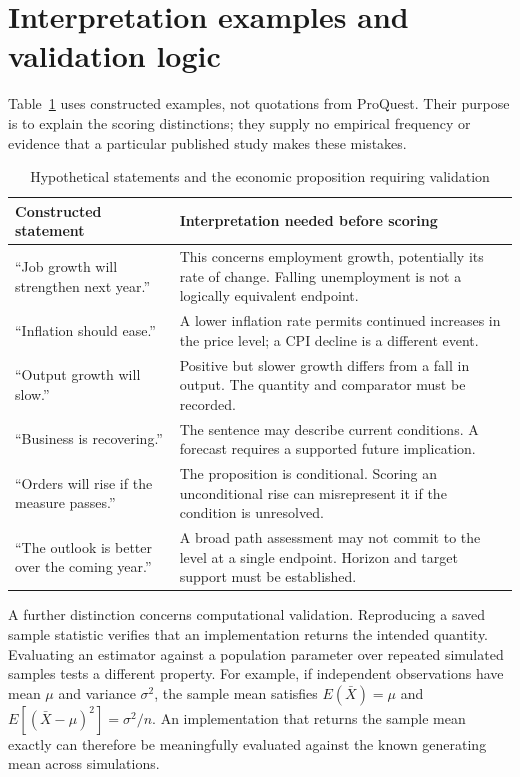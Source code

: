 \section{Interpretation examples and validation logic}\label{app:examples}
Table~\ref{tab:examples} uses constructed examples, not quotations from ProQuest. Their purpose is to explain the scoring distinctions; they supply no empirical frequency or evidence that a particular published study makes these mistakes.

\begin{table}[h]
\caption{Hypothetical statements and the economic proposition requiring validation}\label{tab:examples}
\small
\begin{tabularx}{\linewidth}{p{.30\linewidth}X}
\toprule
Constructed statement & Interpretation needed before scoring\\
\midrule
``Job growth will strengthen next year.'' & This concerns employment growth, potentially its rate of change. Falling unemployment is not a logically equivalent endpoint.\\[5pt]
``Inflation should ease.'' & A lower inflation rate permits continued increases in the price level; a CPI decline is a different event.\\[5pt]
``Output growth will slow.'' & Positive but slower growth differs from a fall in output. The quantity and comparator must be recorded.\\[5pt]
``Business is recovering.'' & The sentence may describe current conditions. A forecast requires a supported future implication.\\[5pt]
``Orders will rise if the measure passes.'' & The proposition is conditional. Scoring an unconditional rise can misrepresent it if the condition is unresolved.\\[5pt]
``The outlook is better over the coming year.'' & A broad path assessment may not commit to the level at a single endpoint. Horizon and target support must be established.\\
\bottomrule
\end{tabularx}
\end{table}

A further distinction concerns computational validation. Reproducing a saved sample statistic verifies that an implementation returns the intended quantity. Evaluating an estimator against a population parameter over repeated simulated samples tests a different property. For example, if independent observations have mean $\mu$ and variance $\sigma^2$, the sample mean satisfies $E(\bar X)=\mu$ and $E[(\bar X-\mu)^2]=\sigma^2/n$. An implementation that returns the sample mean exactly can therefore be meaningfully evaluated against the known generating mean across simulations.


